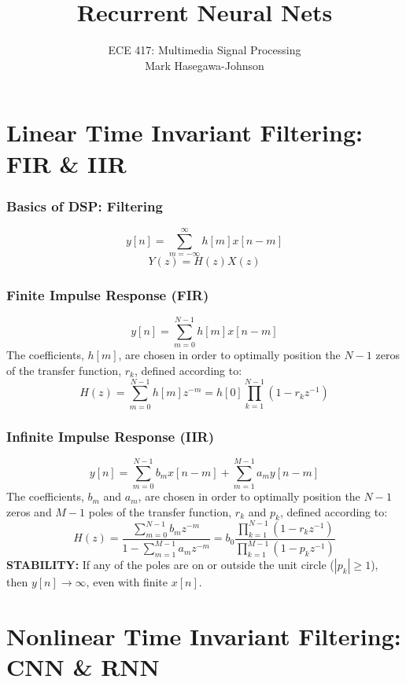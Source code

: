 \documentclass{beamer}
\title{Recurrent Neural Nets}
\author{ECE 417: Multimedia Signal Processing\\
Mark Hasegawa-Johnson}
\institute{University of Illinois}
\begin{document}
\begin{frame}
  \maketitle
\end{frame}

\begin{frame}
  \tableofcontents
\end{frame}

\section[FIR/IIR]{Linear Time Invariant Filtering: FIR \& IIR}
\setcounter{subsection}{1}

\begin{frame}
  \frametitle{Basics of DSP: Filtering}
  \[
  y[n] = \sum_{m=-\infty}^\infty h[m] x[n-m]
  \]
  \[
  Y(z)=H(z)X(z)
  \]
\end{frame}

\begin{frame}
  \frametitle{Finite Impulse Response (FIR)}
  \[
  y[n] = \sum_{m=0}^{N-1}h[m]x[n-m]
  \]
  The coefficients, $h[m]$, are chosen in order to optimally position
  the $N-1$ zeros of the transfer function, $r_k$, defined according to:
  \[
  H(z)=\sum_{m=0}^{N-1}h[m] z^{-m}=h[0]\prod_{k=1}^{N-1}\left(1-r_kz^{-1}\right)
  \]
\end{frame}

\begin{frame}
  \frametitle{Infinite Impulse Response (IIR)}
  \[
  y[n] = \sum_{m=0}^{N-1}b_mx[n-m] + \sum_{m=1}^{M-1}a_m y[n-m]
  \]
  The coefficients, $b_m$ and $a_m$, are chosen in order to optimally
  position the $N-1$ zeros and $M-1$ poles of the transfer function,
  $r_k$ and $p_k$, defined according to:
  \[
  H(z)=\frac{\sum_{m=0}^{N-1}b_m z^{-m}}{1-\sum_{m=1}^{M-1}a_m z^{-m}}
  =b_0\frac{\prod_{k=1}^{N-1}\left(1-r_kz^{-1}\right)}{\prod_{k=1}^{M-1}\left(1-p_kz^{-1}\right)}
  \]
  {\bf STABILITY:} If any of the poles are on or outside the unit
  circle ($|p_k|\ge 1$), then $y[n]\rightarrow\infty$, even with
  finite $x[n]$.
\end{frame}

\section[CNN/RNN]{Nonlinear Time Invariant Filtering: CNN \& RNN}
\setcounter{subsection}{1}
\end{document}
